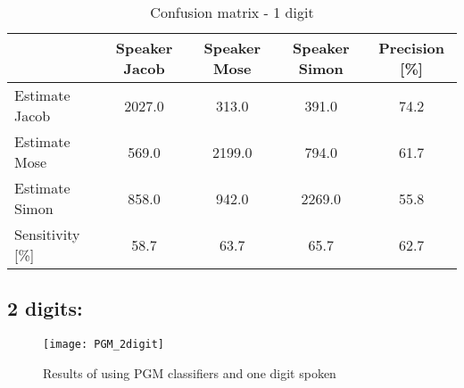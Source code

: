 \begin{table}[H]                                                    
\centering                                                          
\begin{tabular}{|l|c|c|c|c|}                                        
\hline                                                              
  & Speaker Jacob & Speaker Mose & Speaker Simon & Precision [\%] \\
\hline                                                              
Estimate Jacob & 2027.0 & 313.0 & 391.0 & 74.2 \\                   
\hline                                                              
Estimate Mose & 569.0 & 2199.0 & 794.0 & 61.7 \\                    
\hline                                                              
Estimate Simon & 858.0 & 942.0 & 2269.0 & 55.8 \\                   
\hline                                                              
Sensitivity [\%] & 58.7 & 63.7 & 65.7 & 62.7 \\                     
\hline                                                              
\end{tabular}                                                       
\caption{Confusion matrix - 1 digit}                                
\label{table:PGM_conf_1}                                            
\end{table}       


\subsection{2 digits:}

\begin{figure}[H]
\centering
\texttt{[image: PGM\_2digit]}
\caption{Results of using PGM classifiers and one digit spoken}
\label{fig:PGM_1dig}
\end{figure}

